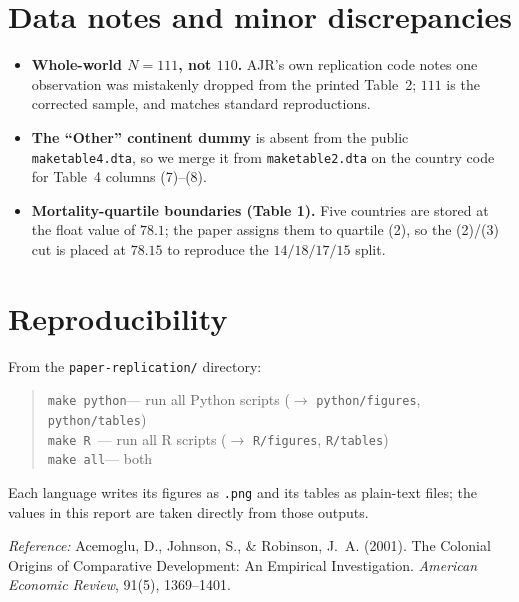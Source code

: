 \documentclass[11pt]{article}
\begin{document}
\section{Data notes and minor discrepancies}

\begin{itemize}
  \item \textbf{Whole-world $N=111$, not $110$.} AJR's own replication code notes
        one observation was mistakenly dropped from the printed Table~2; $111$
        is the corrected sample, and matches standard reproductions.
  \item \textbf{The ``Other'' continent dummy} is absent from the public
        \texttt{maketable4.dta}, so we merge it from \texttt{maketable2.dta} on
        the country code for Table~4 columns (7)--(8).
  \item \textbf{Mortality-quartile boundaries (Table 1).} Five countries are
        stored at the float value of $78.1$; the paper assigns them to quartile
        (2), so the (2)/(3) cut is placed at $78.15$ to reproduce the
        $14/18/17/15$ split.
\end{itemize}

\section{Reproducibility}

From the \texttt{paper-replication/} directory:
\begin{quote}
\texttt{make python}\quad --- run all Python scripts ($\rightarrow$ \texttt{python/figures}, \texttt{python/tables})\\
\texttt{make R}\qquad\;\, --- run all R scripts ($\rightarrow$ \texttt{R/figures}, \texttt{R/tables})\\
\texttt{make all}\qquad --- both
\end{quote}
Each language writes its figures as \texttt{.png} and its tables as plain-text
files; the values in this report are taken directly from those outputs.

\bigskip
\noindent\emph{Reference:} Acemoglu, D., Johnson, S., \& Robinson, J.~A. (2001).
The Colonial Origins of Comparative Development: An Empirical Investigation.
\emph{American Economic Review}, 91(5), 1369--1401.
\end{document}
